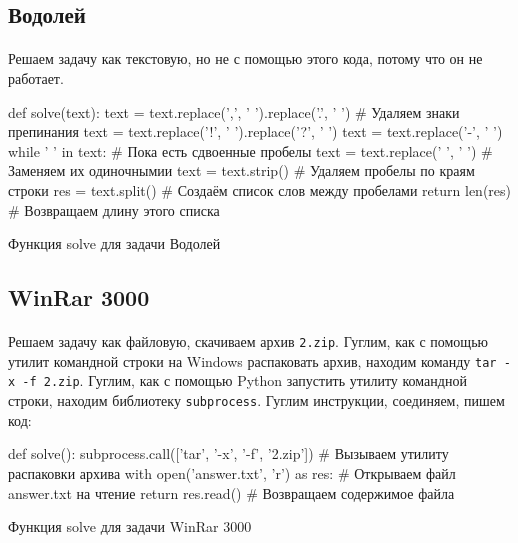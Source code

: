\documentclass[12pt]{article}
\begin{document}

    \subsection{Водолей}
    \paragraph{}
    Решаем задачу как текстовую, но не с помощью этого кода, потому что он не работает.
    \begin{listing}[H]
        \begin{pythoncode}
def solve(text):
    text = text.replace(',', ' ').replace('.', ' ')  # Удаляем знаки препинания
    text = text.replace('!', ' ').replace('?', ' ')
    text = text.replace('-', ' ')
    while '  ' in text:                              # Пока есть сдвоенные пробелы
        text = text.replace('  ', ' ')               # Заменяем их одиночнымии
    text = text.strip()                              # Удаляем пробелы по краям строки
    res = text.split()                               # Создаём список слов между пробелами
    return len(res)                                  # Возвращаем длину этого списка
        \end{pythoncode}
        \caption{Функция solve для задачи Водолей}
        \label{lst:solve1}
    \end{listing}

    \subsection{WinRar 3000}
    \paragraph{}
    Решаем задачу как файловую, скачиваем архив \verb|2.zip|.
    Гуглим, как с помощью утилит командной строки на Windows распаковать архив, находим команду \verb|tar -x -f 2.zip|.
    Гуглим, как с помощью Python запустить утилиту командной строки, находим библиотеку \verb|subprocess|.
    Гуглим инструкции, соединяем, пишем код:
    \begin{listing}[H]
        \begin{pythoncode}
def solve():
    subprocess.call(['tar',  '-x', '-f',  '2.zip']) # Вызываем утилиту распаковки архива
    with open('answer.txt', 'r') as res:            # Открываем файл answer.txt на чтение
        return res.read()                           # Возвращаем содержимое файла
        \end{pythoncode}
        \caption{Функция solve для задачи WinRar 3000}
        \label{lst:solve2}
    \end{listing}
\end{document}
